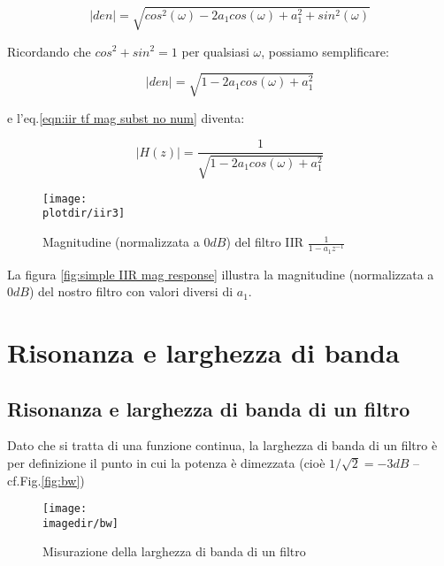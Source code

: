 	\begin{equation}
		|den| = \sqrt{cos^2 ( \omega ) - 2 a_1 cos ( \omega ) + a_1^2 + sin^2 ( \omega )}
	\end{equation}

Ricordando che $cos^2 + sin^2 = 1$ per qualsiasi $\omega$, possiamo
semplificare:

	\begin{equation}
		|den| = \sqrt{1 - 2 a_1 cos ( \omega ) + a_1^2}
	\end{equation}

e l'eq.\ref{eqn:iir tf mag subst no num} diventa:

	\begin{equation}
		|H(z)| = \frac{1}{\sqrt{1 - 2 a_1 cos ( \omega ) + a_1^2}}
	\end{equation}

	\begin{figure}[htb]
		\begin{center}
			\texttt{[image: \\plotdir/iir3]}
			\caption{Magnitudine (normalizzata a $0 dB$) del filtro IIR $\frac{1}{1 - a_1 z^{-1}}$\label{fig:simple IIR mag response}}
		\end{center}
	\end{figure}

	La figura \vref{fig:simple IIR mag response} illustra la magnitudine
	(normalizzata a $0 dB$) del nostro filtro con valori diversi di $a_1$.

\section{Risonanza e larghezza di banda\label{sec:resonance}}

\subsection{Risonanza e larghezza di banda di un filtro}
Dato che si tratta di una funzione continua, la larghezza di banda di un
  filtro \`e per definizione il punto in cui la potenza \`e dimezzata (cio\`e
	$1/\sqrt{2} = -3 dB$ -- cf.Fig.\vref{fig:bw})

	\begin{figure}[htb]
		\begin{center}
		  \texttt{[image: \\imagedir/bw]}
		  \caption{Misurazione della larghezza di banda di un filtro\label{fig:bw}}
		\end{center}
	\end{figure}

